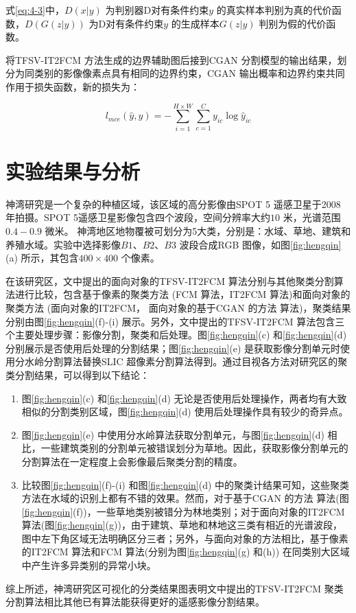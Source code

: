式\ref{eq:4-3}中，$D(x|y)$ 为判别器D对有条件约束$y$ 的真实样本判别为真的代价函数，$D(G(z|y))$ 为D对有条件约束$y$ 的生成样本$G(z|y)$ 判别为假的代价函数。

将TFSV-IT2FCM 方法生成的边界辅助图后接到CGAN 分割模型的输出结果，划分为同类别的影像像素点具有相同的边界约束，CGAN 输出概率和边界约束共同作用于损失函数，新的损失为：

\begin{equation}
    \label{eq:4-5}
    l_{mce} (\hat{y}, y) = -\sum_{i=1}^{H\times W}\sum_{c=1}^{C}y_{ic}\log\hat{y}_{ic}
  \end{equation}


\section{实验结果与分析}
\label{sec::chap04-5}

神湾研究是一个复杂的种植区域，该区域的高分影像由SPOT 5 遥感卫星于2008 年拍摄。SPOT 5遥感卫星影像包含四个波段，空间分辨率大约$10$ 米，光谱范围$0.4-0.9$ 微米。 神湾地区地物覆被可划分为5大类，分别是：水域、草地、建筑和养殖水域。实验中选择影像$B1$、$B2$、$B3$ 波段合成RGB 图像，如图\ref{fig:hengqin}(a) 所示，其包含$400 \times 400$ 个像素。

在该研究区，文中提出的面向对象的TFSV-IT2FCM 算法分别与其他聚类分割算法进行比较，包含基于像素的聚类方法 (FCM 算法，IT2FCM 算法)和面向对象的聚类方法 (面向对象的IT2FCM， 面向对象的基于CGAN 的方法 算法)，聚类结果分别由图\ref{fig:hengqin}(f)-(i) 展示。另外，文中提出的TFSV-IT2FCM 算法包含三个主要处理步骤：影像分割，聚类和后处理。图\ref{fig:hengqin}(c) 和\ref{fig:hengqin}(d) 分别展示是否使用后处理的分割结果；图\ref{fig:hengqin}(e) 是获取影像分割单元时使用分水岭分割算法替换SLIC 超像素分割算法得到。通过目视各方法对研究区的聚类分割结果，可以得到以下结论：

\begin{enumerate}[(1)]
    \item 图\ref{fig:hengqin}(c) 和\ref{fig:hengqin}(d) 无论是否使用后处理操作，两者均有大致相似的分割类别区域，图\ref{fig:hengqin}(d) 使用后处理操作具有较少的奇异点。
    \item 图\ref{fig:hengqin}(e) 中使用分水岭算法获取分割单元，与图\ref{fig:hengqin}(d) 相比，一些建筑类别的分割单元被错误划分为草地。因此，获取影像分割单元的分割算法在一定程度上会影像最后聚类分割的精度。
    \item 比较图\ref{fig:hengqin}(f)-(i) 和图\ref{fig:hengqin}(d) 中的聚类计结果可知，这些聚类方法在水域的识别上都有不错的效果。然而，对于基于CGAN 的方法 算法(图\ref{fig:hengqin}(f))，一些草地类别被错分为林地类别；对于面向对象的IT2FCM 算法(图\ref{fig:hengqin}(g))，由于建筑、草地和林地这三类有相近的光谱波段，图中左下角区域无法明确区分三者；另外，与面向对象的方法相比，基于像素的IT2FCM 算法和FCM 算法(分别为图\ref{fig:hengqin}(g) 和(h)) 在同类别大区域中产生许多异类别的异常小块。
\end{enumerate}
综上所述，神湾研究区可视化的分类结果图表明文中提出的TFSV-IT2FCM 聚类分割算法相比其他已有算法能获得更好的遥感影像分割结果。


